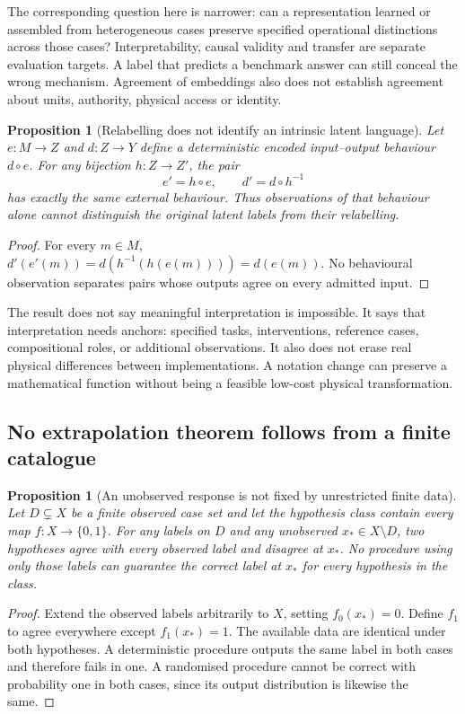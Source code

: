\documentclass[11pt,a4paper]{article}
\newtheorem{proposition}[theorem]{Proposition}
\theoremstyle{definition}
\theoremstyle{remark}
\begin{document}
The corresponding question here is narrower: can a representation learned or assembled from heterogeneous cases preserve specified operational distinctions across those cases? Interpretability, causal validity and transfer are separate evaluation targets. A label that predicts a benchmark answer can still conceal the wrong mechanism. Agreement of embeddings also does not establish agreement about units, authority, physical access or identity.

\begin{proposition}[Relabelling does not identify an intrinsic latent language]\label{prop:relabel}
Let $e:M\to Z$ and $d:Z\to Y$ define a deterministic encoded input--output behaviour $d\circ e$. For any bijection $h:Z\to Z'$, the pair
\[
 e'=h\circ e,\qquad d'=d\circ h^{-1}
\]
has exactly the same external behaviour. Thus observations of that behaviour alone cannot distinguish the original latent labels from their relabelling.
\end{proposition}
\begin{proof}
For every $m\in M$, $d'(e'(m))=d(h^{-1}(h(e(m))))=d(e(m))$. No behavioural observation separates pairs whose outputs agree on every admitted input.
\end{proof}

The result does not say meaningful interpretation is impossible. It says that interpretation needs anchors: specified tasks, interventions, reference cases, compositional roles, or additional observations. It also does not erase real physical differences between implementations. A notation change can preserve a mathematical function without being a feasible low-cost physical transformation.

\subsection{No extrapolation theorem follows from a finite catalogue}
\begin{proposition}[An unobserved response is not fixed by unrestricted finite data]\label{prop:finitecorpus}
Let $D\subsetneq X$ be a finite observed case set and let the hypothesis class contain every map $f:X\to\{0,1\}$. For any labels on $D$ and any unobserved $x_*\in X\setminus D$, two hypotheses agree with every observed label and disagree at $x_*$. No procedure using only those labels can guarantee the correct label at $x_*$ for every hypothesis in the class.
\end{proposition}
\begin{proof}
Extend the observed labels arbitrarily to $X$, setting $f_0(x_*)=0$. Define $f_1$ to agree everywhere except $f_1(x_*)=1$. The available data are identical under both hypotheses. A deterministic procedure outputs the same label in both cases and therefore fails in one. A randomised procedure cannot be correct with probability one in both cases, since its output distribution is likewise the same.
\end{proof}
\end{document}
